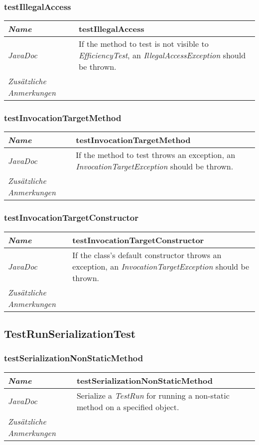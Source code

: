 \documentclass[a4paper]{report}
\begin{document}
\subsubsection{testIllegalAccess}
\begin{tabular}{p{2.3cm}  p{11.5cm}}
  \hline
 \textit{Name} & testIllegalAccess\\
  \hline
 \textit{JavaDoc} & If the method to test is not visible to \emph{EfficiencyTest}, an \emph{IllegalAccessException} should be thrown. \\
  \hline
 \textit{Zusätzliche Anmerkungen} & \\
  \hline
\end{tabular}

\subsubsection{testInvocationTargetMethod}
\begin{tabular}{p{2.3cm}  p{11.5cm}}
  \hline
 \textit{Name} & testInvocationTargetMethod\\
  \hline
 \textit{JavaDoc} & If the method to test throws an exception, an \emph{InvocationTargetException} should be thrown. \\
  \hline
 \textit{Zusätzliche Anmerkungen} & \\
  \hline
\end{tabular}

\subsubsection{testInvocationTargetConstructor}
\begin{tabular}{p{2.3cm}  p{11.5cm}}
  \hline
 \textit{Name} & testInvocationTargetConstructor\\
  \hline
 \textit{JavaDoc} & If the class's default constructor throws an exception, an \emph{InvocationTargetException} should be thrown. \\
  \hline
 \textit{Zusätzliche Anmerkungen} & \\
  \hline
\end{tabular}

\subsection{TestRunSerializationTest}

\subsubsection{testSerializationNonStaticMethod}
\begin{tabular}{p{2.3cm}  p{11.5cm}}
  \hline
 \textit{Name} & testSerializationNonStaticMethod\\
  \hline
 \textit{JavaDoc} & Serialize a \emph{TestRun} for running a non-static method on a specified object. \\
  \hline
 \textit{Zusätzliche Anmerkungen} & \\
  \hline
\end{tabular}
\end{document}
